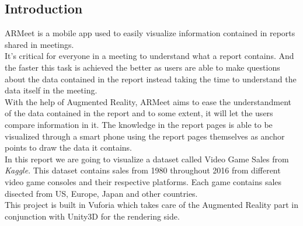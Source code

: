 \subsection*{Introduction} %
ARMeet is a mobile app used to easily visualize information contained in
reports shared in meetings.\\

It's critical for everyone in a meeting to understand what a report
contains. And the faster this task is achieved the better as users are able
to make questions about the data contained in the report instead taking the
time to understand the data itself in the meeting.\\

With the help of Augmented Reality, ARMeet aims to ease the understandment of
the data contained in the report and to some extent, it will let the users
compare information in it. The knowledge in the report pages is able to be
visualized through a smart phone using the report pages themselves as anchor
points to draw the data it contains.\\

In this report we are going to visualize a dataset called Video Game Sales from
\textit{Kaggle}\cite{KaggleDataset}. This dataset contains sales from 1980
throughout 2016 from different video game consoles and their respective
platforms. Each game contains sales disected from US, Europe, Japan and other
countries.\\

This project is built in Vuforia\cite{Vuforia} which takes care of the Augmented Reality part in
conjunction with Unity3D\cite{Unity3D} for the rendering side.
\newpage
